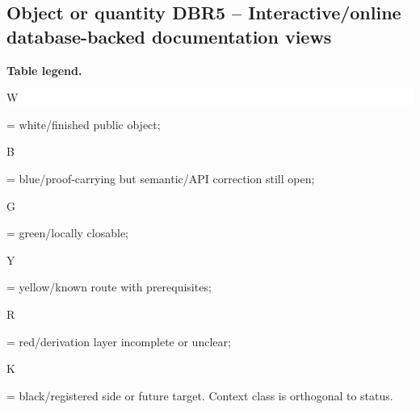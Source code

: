 \subsection*{Object or quantity DBR5 -- Interactive/\allowbreak{}online database-backed documentation views}
\hypertarget{objproof:DBR5}{}
\par\smallskip\noindent\begin{minipage}{0.99\linewidth}\footnotesize\raggedright\textbf{Table legend.} \colorbox{white}{\strut W} = white/finished public object; \colorbox{cyan!20}{\strut B} = blue/proof-carrying but semantic/API correction still open; \colorbox{green!18}{\strut G} = green/locally closable; \colorbox{yellow!25}{\strut Y} = yellow/known route with prerequisites; \colorbox{red!20}{\strut R} = red/derivation layer incomplete or unclear; \colorbox{black!18}{\strut K} = black/registered side or future target. Context class is orthogonal to status.\end{minipage}\par\vspace{0.25em}
